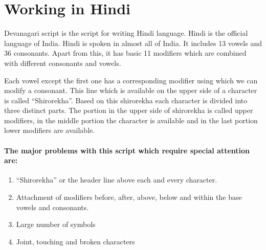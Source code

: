 \chapter{Working in Hindi}
\label{chap:hindi}

Devanagari script is the script for writing Hindi language. Hindi is the official language of India. Hindi is spoken in almost all of India. It includes 13 vowels and 36 consonants. Apart from this, it has basic 11 modifiers which are combined with different consonants and vowels.

Each vowel except the first one has a corresponding modifier using which we can modify a consonant. This line which is available on the upper side of a character is called “Shirorekha''. Based on this shirorekha each character is divided into three distinct parts. The portion in the upper side of shirorekha is called upper modifiers, in the middle portion the character is available and in the last portion lower modifiers are available. 
\subsubsection{The major problems with this script which require special attention are:}
\begin{enumerate}
\item “Shirorekha” or the header line above each and every character.
\item Attachment of modifiers before, after, above, below and within the base vowels and consonants.
\item Large number of symbols
\item Joint, touching and broken characters
\end{enumerate}